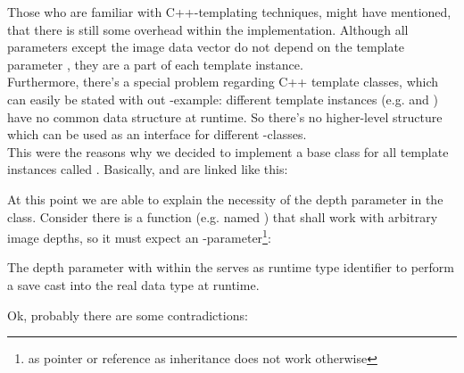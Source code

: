 
Those who are familiar with C++-templating techniques, might have mentioned, that there is still some overhead within the implementation. Although all parameters except the image data vector do not depend on the template parameter , they are a part of each template instance.\\
Furthermore, there's a special problem regarding C++ template classes, which can easily be stated with out -example: different template instances (e.g.  and ) have no common data structure at runtime. So there's no higher-level structure which can be used as an interface for different -classes.\\
This were the reasons why we decided to implement a base class for all  template instances called  . Basically,  and  are linked like this:


At this point we are able to explain the necessity of the depth parameter in the  class. Consider there is a function (e.g. named ) that shall work with arbitrary image depths, so it must expect an -parameter\footnote{as pointer or reference as inheritance does not work otherwise}:


The depth parameter with within the  serves as runtime type identifier to perform a save cast into the real data type at runtime.


Ok, probably there are some contradictions:\\

